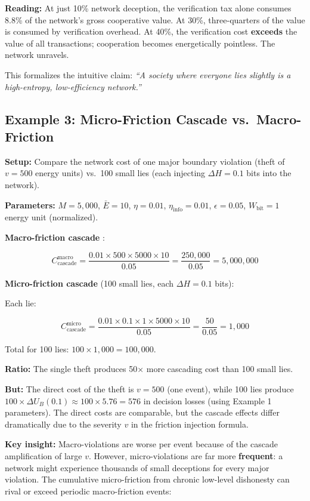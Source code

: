 \documentclass[11pt]{article}
\theoremstyle{plain}
\theoremstyle{definition}
\theoremstyle{remark}
\let\origsubsection\subsection
\renewcommand{\subsection}{\needspace{7\baselineskip}\origsubsection}
\begin{document}
\textbf{Reading:} At just 10\% network deception, the verification tax
alone consumes 8.8\% of the network's gross cooperative value. At 30\%,
three-quarters of the value is consumed by verification overhead. At
40\%, the verification cost \textbf{exceeds} the value of all
transactions; cooperation becomes energetically pointless. The network
unravels.

This formalizes the intuitive claim: \emph{``A society where everyone
lies slightly is a high-entropy, low-efficiency network.''}

\subsection{Example 3: Micro-Friction Cascade
vs.~Macro-Friction}\label{example-3-micro-friction-cascade-vs.-macro-friction}

\textbf{Setup:} Compare the network cost of one major boundary violation
(theft of \(v = 500\) energy units) vs.~100 small lies (each injecting
\(\Delta H = 0.1\) bits into the network).

\textbf{Parameters:} \(M = 5{,}000\), \(\bar{E} = 10\), \(\eta = 0.01\),
\(\eta_{\text{info}} = 0.01\), \(\epsilon = 0.05\),
\(W_{\text{bit}} = 1\) energy unit (normalized).

\textbf{Macro-friction cascade} \citep{TC-IV}:

\[C_{\text{cascade}}^{\text{macro}} = \frac{0.01 \times 500 \times 5000 \times 10}{0.05} = \frac{250{,}000}{0.05} = 5{,}000{,}000\]

\textbf{Micro-friction cascade} (100 small lies, each \(\Delta H = 0.1\)
bits):

Each lie:

\[C_{\text{cascade}}^{\text{micro}} = \frac{0.01 \times 0.1 \times 1 \times 5000 \times 10}{0.05} = \frac{50}{0.05} = 1{,}000\]

Total for 100 lies: \(100 \times 1{,}000 = 100{,}000\).

\textbf{Ratio:} The single theft produces 50× more cascading cost than
100 small lies.

\textbf{But:} The direct cost of the theft is \(v = 500\) (one event),
while 100 lies produce
\(100 \times \Delta U_B(0.1) \approx 100 \times 5.76 = 576\) in decision
losses (using Example 1 parameters). The direct costs are comparable,
but the cascade effects differ dramatically due to the severity \(v\) in
the friction injection formula.

\textbf{Key insight:} Macro-violations are worse per event because of
the cascade amplification of large \(v\). However, micro-violations are
far more \textbf{frequent}: a network might experience thousands of
small deceptions for every major violation. The cumulative
micro-friction from chronic low-level dishonesty can rival or exceed
periodic macro-friction events:
\end{document}
